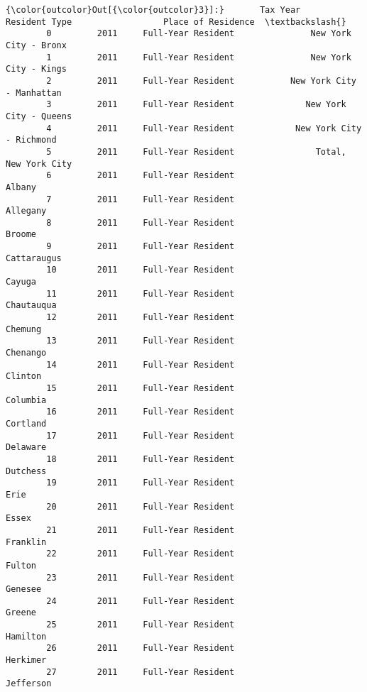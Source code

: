 \documentclass[11pt]{article}
\begin{document}
\begin{Verbatim}[commandchars=\\\{\}]
{\color{outcolor}Out[{\color{outcolor}3}]:}       Tax Year          Resident Type                  Place of Residence  \textbackslash{}
        0         2011     Full-Year Resident               New York City - Bronx   
        1         2011     Full-Year Resident               New York City - Kings   
        2         2011     Full-Year Resident           New York City - Manhattan   
        3         2011     Full-Year Resident              New York City - Queens   
        4         2011     Full-Year Resident            New York City - Richmond   
        5         2011     Full-Year Resident                Total, New York City   
        6         2011     Full-Year Resident                              Albany   
        7         2011     Full-Year Resident                            Allegany   
        8         2011     Full-Year Resident                              Broome   
        9         2011     Full-Year Resident                         Cattaraugus   
        10        2011     Full-Year Resident                              Cayuga   
        11        2011     Full-Year Resident                          Chautauqua   
        12        2011     Full-Year Resident                             Chemung   
        13        2011     Full-Year Resident                            Chenango   
        14        2011     Full-Year Resident                             Clinton   
        15        2011     Full-Year Resident                            Columbia   
        16        2011     Full-Year Resident                            Cortland   
        17        2011     Full-Year Resident                            Delaware   
        18        2011     Full-Year Resident                            Dutchess   
        19        2011     Full-Year Resident                                Erie   
        20        2011     Full-Year Resident                               Essex   
        21        2011     Full-Year Resident                            Franklin   
        22        2011     Full-Year Resident                              Fulton   
        23        2011     Full-Year Resident                             Genesee   
        24        2011     Full-Year Resident                              Greene   
        25        2011     Full-Year Resident                            Hamilton   
        26        2011     Full-Year Resident                            Herkimer   
        27        2011     Full-Year Resident                           Jefferson   

\end{Verbatim}
\end{document}
